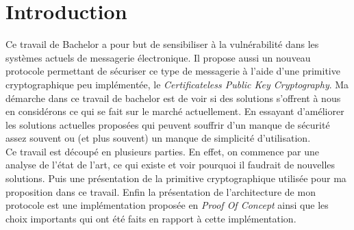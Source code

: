 \chapter{Introduction}
\label{ch:intro}

Ce travail de Bachelor a pour but de sensibiliser à la vulnérabilité dans les systèmes actuels de messagerie électronique. Il propose aussi un nouveau protocole permettant de sécuriser ce type de messagerie à l'aide d'une primitive cryptographique peu implémentée, le \textit{Certificateless Public Key Cryptography}. Ma démarche dans ce travail de bachelor est de voir si des solutions s'offrent à nous en considérons ce qui se fait sur le marché actuellement. En essayant d'améliorer les solutions actuelles proposées qui peuvent souffrir d'un manque de sécurité assez souvent ou (et plus souvent) un manque de simplicité d'utilisation.\\
Ce travail est découpé en plusieurs parties. En effet, on commence par une analyse de l'état de l'art, ce qui existe et voir pourquoi il faudrait de nouvelles solutions. Puis une présentation de la primitive cryptographique utilisée pour ma proposition dans ce travail. Enfin la présentation de l'architecture de mon protocole est une implémentation proposée en \textit{Proof Of Concept} ainsi que les choix importants qui ont été faits en rapport à cette implémentation.